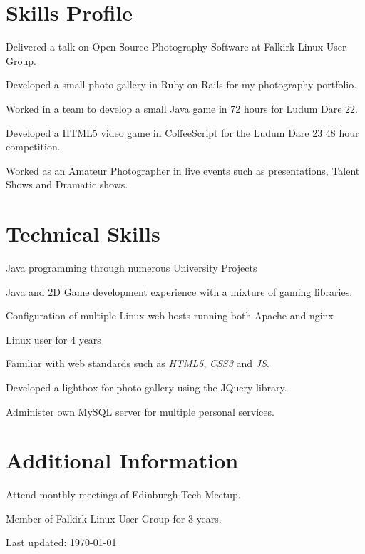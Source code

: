 \documentclass[11pt,a4paper]{article}
\renewenvironment{itemize}{
  \begin{list}{}{
    \setlength{\leftmargin}{1.5em}
    \setlength{\itemsep}{0.25em}
    \setlength{\parskip}{0pt}
    \setlength{\parsep}{0.25em}
    \renewcommand{\labelitemi}{$\bullet$}
  }
}{
  \end{list}
}
\begin{document}
\section*{Skills Profile}

\begin{itemize}
    \item Delivered a talk on Open Source Photography Software at Falkirk Linux User Group.
    \item Developed a small photo gallery in Ruby on Rails for my photography portfolio.
    \item Worked in a team to develop a small Java game in 72 hours for Ludum Dare 22.
    \item Developed a HTML5 video game in CoffeeScript for the Ludum Dare 23
    48 hour competition.
    \item Worked as an Amateur Photographer in live events such as presentations, Talent Shows and Dramatic shows.

\end{itemize}

\section*{Technical Skills}

\begin{itemize}
    \item Java programming through numerous University Projects
    \item Java and 2D Game development experience with a mixture of gaming libraries.
    \item Configuration of multiple Linux web hosts running both Apache and nginx 
    \item Linux user for 4 years
    \item Familiar with web standards such as \emph{HTML5}, \emph{CSS3} and \emph{JS}.
    \item Developed a lightbox for photo gallery using the JQuery library.
    \item Administer own MySQL server for multiple personal services.
\end{itemize}

\section*{Additional Information}

\begin{itemize}
    \item Attend monthly meetings of Edinburgh Tech Meetup.
    \item Member of Falkirk Linux User Group for 3 years.
    

\end{itemize}



\medskip
\begin{center}
  \begin{small}
    Last updated: \today
  \end{small}
\end{center}
\end{document}
